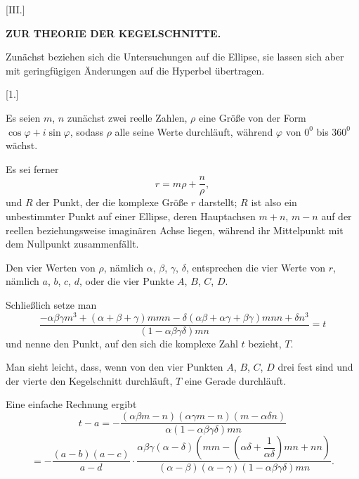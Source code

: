 
\begin{center}
[III.]

\textbf{ZUR THEORIE DER KEGELSCHNITTE.}
\end{center}

Zunächst beziehen sich die Untersuchungen auf die Ellipse, sie lassen sich
aber mit geringfügigen Änderungen auf die Hyperbel übertragen.

\begin{center}
[1.]
\end{center}

Es seien $m$, $n$ zunächst zwei reelle Zahlen, $\rho$ eine Größe von der
Form $\cos\varphi + i\sin\varphi$, sodass $\rho$ alle seine Werte
durchläuft, während $\varphi$ von $0^0$ bis $360^0$ wächst.

Es sei ferner
\[
r = m\rho + \dfrac{n}{\rho},
\]
und $R$ der Punkt, der die komplexe Größe $r$ darstellt; $R$ ist also
ein unbestimmter Punkt auf einer Ellipse, deren Hauptachsen $m+n$, $m-n$ auf
der reellen beziehungsweise imaginären Achse liegen, während ihr
Mittelpunkt mit dem Nullpunkt zusammenfällt.

Den vier Werten von $\rho$, nämlich $\alpha$, $\beta$, $\gamma$, $\delta$,
entsprechen die vier Werte von $r$, nämlich $a$, $b$, $c$, $d$, oder die vier
Punkte $A$, $B$, $C$, $D$.

Schließlich setze man
\[
\dfrac{-\alpha\beta\gamma m^3 + (\alpha+\beta+\gamma) m m n
  - \delta(\alpha\beta+\alpha\gamma+\beta\gamma) m n n + \delta n^3}
  {(1-\alpha\beta\gamma\delta) m n} = t
\]
und nenne den Punkt, auf den sich die komplexe Zahl $t$ bezieht, $T$.

Man sieht leicht, dass, wenn von den vier Punkten $A$, $B$, $C$, $D$ drei
fest sind und der vierte den Kegelschnitt durchläuft, $T$ eine Gerade
durchläuft.

Eine einfache Rechnung ergibt
\[
t - a = -\dfrac{(\alpha\beta m - n)(\alpha\gamma m - n)(m - \alpha\delta n)}
  {\alpha(1-\alpha\beta\gamma\delta) m n}
\]
\[
= -\dfrac{(a-b)(a-c)}{a-d} \cdot
  \dfrac{\alpha\beta\gamma(\alpha-\delta)\left(mm -
  \left(\alpha\delta+\dfrac{1}{\alpha\delta}\right) m n + n n\right)}
  {(\alpha-\beta)(\alpha-\gamma)(1-\alpha\beta\gamma\delta) m n}.
\]
